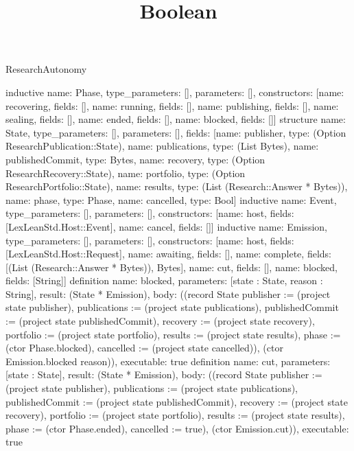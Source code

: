 \begin{lexlean}{ResearchAutonomy}
\title{Boolean}
\begin{semanticmodule}
inductive{
 name: Phase,
 type_parameters: [],
 parameters: [],
 constructors: [{name: recovering, fields: []}, {name: running, fields: []}, {name: publishing, fields: []}, {name: sealing, fields: []}, {name: ended, fields: []}, {name: blocked, fields: []}]
}
structure{
 name: State,
 type_parameters: [],
 parameters: [],
 fields: [{name: publisher, type: (Option ResearchPublication::State)}, {name: publications, type: (List Bytes)}, {name: publishedCommit, type: Bytes}, {name: recovery, type: (Option ResearchRecovery::State)}, {name: portfolio, type: (Option ResearchPortfolio::State)}, {name: results, type: (List (Research::Answer * Bytes))}, {name: phase, type: Phase}, {name: cancelled, type: Bool}]
}
inductive{
 name: Event,
 type_parameters: [],
 parameters: [],
 constructors: [{name: host, fields: [LexLeanStd.Host::Event]}, {name: cancel, fields: []}]
}
inductive{
 name: Emission,
 type_parameters: [],
 parameters: [],
 constructors: [{name: host, fields: [LexLeanStd.Host::Request]}, {name: awaiting, fields: []}, {name: complete, fields: [(List (Research::Answer * Bytes)), Bytes]}, {name: cut, fields: []}, {name: blocked, fields: [String]}]
}
definition{
 name: blocked,
 parameters: [state : State, reason : String],
 result: (State * Emission),
 body: ((record State {publisher := (project state publisher), publications := (project state publications), publishedCommit := (project state publishedCommit), recovery := (project state recovery), portfolio := (project state portfolio), results := (project state results), phase := (ctor Phase.blocked), cancelled := (project state cancelled)}), (ctor Emission.blocked reason)),
 executable: true
}
definition{
 name: cut,
 parameters: [state : State],
 result: (State * Emission),
 body: ((record State {publisher := (project state publisher), publications := (project state publications), publishedCommit := (project state publishedCommit), recovery := (project state recovery), portfolio := (project state portfolio), results := (project state results), phase := (ctor Phase.ended), cancelled := true}), (ctor Emission.cut)),
 executable: true
}
\end{semanticmodule}
\end{lexlean}
